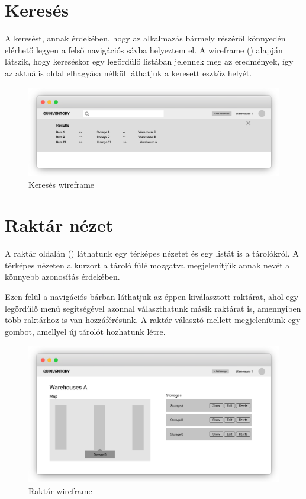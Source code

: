 \section{Keresés}
A keresést, annak érdekében, hogy az alkalmazás bármely részéről könnyedén elérhető legyen a felső navigációs sávba helyeztem el.
A wireframe () alapján látszik, hogy kereséskor egy legördülő listában jelennek meg az eredmények, így az aktuális oldal elhagyása nélkül láthatjuk a keresett eszköz helyét.
\begin{figure}[!ht]
  \centering
  \includegraphics[width=150mm, keepaspectratio]{figures/wireframes/search.png}
  \caption{Keresés wireframe}
  \label{fig:SearchWireframe}
\end{figure}


\section{Raktár nézet}
A raktár oldalán () láthatunk egy térképes nézetet és egy listát is a tárolókról. 
A térképes nézeten a kurzort a tároló fülé mozgatva megjelenítjük annak nevét a könnyebb azonosítás érdekében.

Ezen felül a navigációs bárban láthatjuk az éppen kiválasztott raktárat, ahol egy legördülő menü segítségével azonnal választhatunk másik raktárat is, amennyiben több raktárhoz is van hozzáférésünk.
A raktár választó mellett megjelenítünk egy gombot, amellyel új tárolót hozhatunk létre.
\begin{figure}[!ht]
  \centering
  \includegraphics[width=150mm, keepaspectratio]{figures/wireframes/frame_warehouse.png}
  \caption{Raktár wireframe}
  \label{fig:WarehouseWireframe}
\end{figure}

